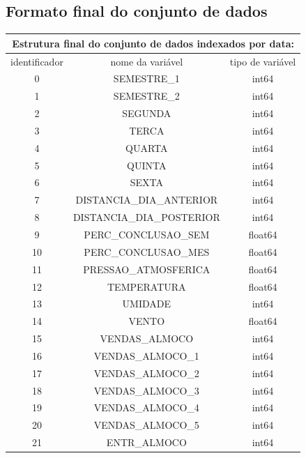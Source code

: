 \documentclass[	12pt, Times, openright, twoside, a4paper, english, brazil]{abntex2}
\begin{document}
	\subsection{Formato final do conjunto de dados}
       \begin{table}[!ht]
            \centering
            \begin{tabular}{|c|c|c|} \hline
                \multicolumn{3}{c}{ Estrutura final do conjunto de dados indexados por data: } \\
                \hline
                identificador &	nome da variável					&tipo de variável\\ 
                \hline
                0&	SEMESTRE\_1					&int64 \\
                1&	SEMESTRE\_2					&int64\\
                2&	SEGUNDA						&int64 \\
                3&	TERCA						&int64 \\
                4&	QUARTA						&int64 \\ 
                5&	QUINTA						&int64 \\ 
                6&	SEXTA						&int64 \\ 
                7&	DISTANCIA\_DIA\_ANTERIOR	&	int64 \\ 
                8&	DISTANCIA\_DIA\_POSTERIOR	&	int64 \\
                9&	PERC\_CONCLUSAO\_SEM		&	float64 \\
                10&	PERC\_CONCLUSAO\_MES		&	float64 \\
                11&	PRESSAO\_ATMOSFERICA		&	float64 \\
                12&	TEMPERATURA					&float64 \\ 
                13&	UMIDADE						&int64 \\
                14&	VENTO						&float64\\ 
                15&	VENDAS\_ALMOCO				&int64 \\
                16&	VENDAS\_ALMOCO\_1			&	int64 \\ 
                17&	VENDAS\_ALMOCO\_2			&	int64 \\
                18&	VENDAS\_ALMOCO\_3			&	int64\\ 
                19&	VENDAS\_ALMOCO\_4			&	int64 \\
                20&	VENDAS\_ALMOCO\_5			&	int64 \\ 
                21&	ENTR\_ALMOCO				&	int64\\

\end{tabular}
\end{table}
\end{document}
